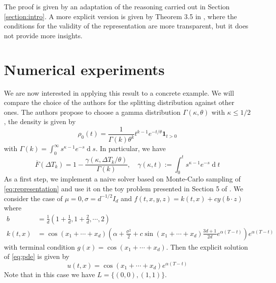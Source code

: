 \documentclass[11pt]{article}
\renewcommand{\leq}{\leqslant}
\newcommand{\diff}{\ensuremath{\operatorname{d}\!}}
\theoremstyle{definition}
\theoremstyle{remark}
\begin{document}
The proof is given by an adaptation of the reasoning carried out in Section \ref{section:intro}.
 A more explicit version is given by Theorem 3.5 in \cite{labordere2019branching}, where the conditions for the validity of the representation are more transparent, but it does not provide more insights.

 \section{Numerical experiments}
 \label{section:numerical-experiments}

We are now interested in applying this result to a concrete example. 
We will compare the choice of the authors for the splitting distribution against other ones. The authors propose to choose a gamma distribution $\Gamma (\kappa,\theta)$ with $\kappa \leq 1/2$, the density is given by 
 \[
	 \rho_0 (t) = \frac{1}{\Gamma(k)\theta ^{k}}t ^{k - 1} e ^{-t /\theta} \mathbf{1} _{t > 0}
 \]
 with $\Gamma(k) = \int_{0}^{\infty} s ^{\kappa - 1}e ^{-s} \diff s$. In particular, we have
 \[
	 \overline{F}(\Delta T _{k}) = 1 - \frac{\gamma(\kappa, \Delta T_k / \theta)}{\Gamma(k)}, \quad \gamma(\kappa,t) := \int_{0}^{t} s ^{\kappa - 1}e ^{-s} \diff t
 \]
 As a first step, we implement a naive solver based on Monte-Carlo sampling of \eqref{eq:representation} and use it on the toy problem presented in Section 5 of \cite{labordere2019branching}.
 We consider the case of $\mu = 0, \sigma = d ^{-1/2} I_d$ and $f(t,x,y,z) = k(t,x) + cy(b \cdot z)$ where
 \begin{align*}
	 b &= \frac{1}{d}(1 + \frac{1}{d}, 1 + \frac{2}{d}, \cdots, 2) \\
	 k(t,x) &= \cos (x_1 + \cdots + x_d) \left( \alpha + \frac{\sigma ^{2}}{2} + c \sin (x_1 + \cdots + x_d) \frac{3d + 1}{2d} e ^{\alpha(T - t)} \right) e ^{\alpha(T - t)}
 \end{align*}
 with terminal condition $g(x) = \cos (x_1 + \cdots + x_d)$. Then the explicit solution of \eqref{eq:pde} is given by
 \[
 u(t,x) = \cos (x_1 + \cdots + x_d) e ^{\alpha(T - t)}
 \]
 Note that in this case we have $L = \{(0,0), (1,1)\}$.



\end{document}
